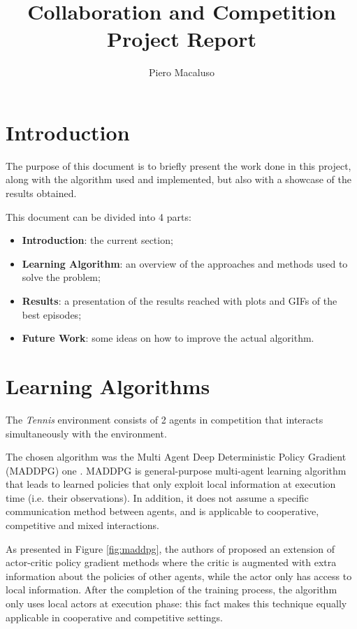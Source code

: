 \documentclass[letterpaper]{article}
\begin{document}
%
\title{Collaboration and Competition Project Report}
\author{Piero Macaluso}
\maketitle

\section{Introduction}

The purpose of this document is to briefly present the work done in this project, along with the algorithm used and implemented, but also with a showcase of the results obtained.

This document can be divided into 4 parts:

\begin{itemize}
\item \textbf{Introduction}: the current section;
\item \textbf{Learning Algorithm}: an overview of the approaches and methods used to solve the problem;
\item \textbf{Results}: a presentation of the results reached with plots and GIFs of the best episodes;
\item \textbf{Future Work}: some ideas on how to improve the actual algorithm.
\end{itemize}

\section{Learning Algorithms}

The \textit{Tennis} environment consists of 2 agents in competition that interacts simultaneously with the environment.

The chosen algorithm was the Multi Agent Deep Deterministic Policy Gradient (MADDPG) one \cite{lowe2017multi}. MADDPG is general-purpose multi-agent learning algorithm that leads to learned
policies that only exploit local information at execution time (i.e. their observations). In addition, it does not assume a specific communication method between agents, and is applicable to cooperative, competitive and mixed interactions.

As presented in Figure \ref{fig:maddpg}, the authors of \cite{lowe2017multi} proposed an extension of actor-critic policy gradient methods where the critic is augmented with extra information about the policies of other agents, while the actor only has access
to local information. After the completion of the training process, the algorithm only uses local actors at execution phase: this fact makes this technique equally applicable in cooperative and competitive settings.
\end{document}
